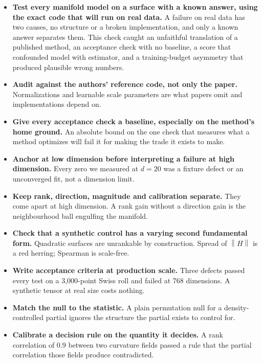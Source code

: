 \documentclass[11pt,a4paper]{article}
\newcommand{\norm}[1]{\left\lVert #1 \right\rVert}
\begin{document}
\begin{itemize}
\item \textbf{Test every manifold model on a surface with a known answer, using the exact code that will run on real data.} A failure on real data has two causes, no structure or a broken implementation, and only a known answer separates them. This check caught an unfaithful translation of a published method, an acceptance check with no baseline, a score that confounded model with estimator, and a training-budget asymmetry that produced plausible wrong numbers.

\item \textbf{Audit against the authors' reference code, not only the paper.} Normalizations and learnable scale parameters are what papers omit and implementations depend on.

\item \textbf{Give every acceptance check a baseline, especially on the method's home ground.} An absolute bound on the one check that measures what a method optimizes will fail it for making the trade it exists to make.

\item \textbf{Anchor at low dimension before interpreting a failure at high dimension.} Every zero we measured at $d = 20$ was a fixture defect or an unconverged fit, not a dimension limit.

\item \textbf{Keep rank, direction, magnitude and calibration separate.} They come apart at high dimension. A rank gain without a direction gain is the neighbourhood ball engulfing the manifold.

\item \textbf{Check that a synthetic control has a varying second fundamental form.} Quadratic surfaces are unrankable by construction. Spread of $\norm{H}$ is a red herring; Spearman is scale-free.

\item \textbf{Write acceptance criteria at production scale.} Three defects passed every test on a 3{,}000-point Swiss roll and failed at 768 dimensions. A synthetic tensor at real size costs nothing.

\item \textbf{Match the null to the statistic.} A plain permutation null for a density-controlled partial ignores the structure the partial exists to control for.

\item \textbf{Calibrate a decision rule on the quantity it decides.} A rank correlation of 0.9 between two curvature fields passed a rule that the partial correlation those fields produce contradicted.


\end{itemize}
\end{document}
